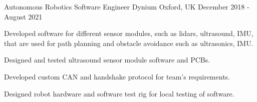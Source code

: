 \begin{cventries}
  \cventry
    {Autonomous Robotics Software Engineer} %
    {Dynium} %
    {Oxford, UK} %
    {December 2018 - August 2021} %
    {
      \begin{cvitems} %
        \item {Developed software for different sensor modules, such as lidars, ultrasound, IMU, that are used for path planning and obstacle avoidance such
        as ultrasonics, IMU.}
        \item {Designed and tested ultrasound sensor module software and PCBs.}
        \item {Developed custom CAN and handshake protocol for team’s requirements.}
        \item {Designed robot hardware and software test rig for local testing of software.}
      \end{cvitems}
    }

\end{cventries}
